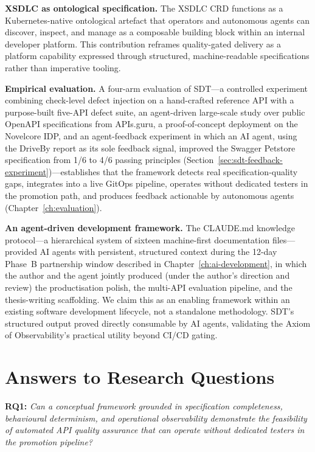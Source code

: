 \textbf{XSDLC as ontological specification.} The XSDLC CRD functions as a Kubernetes-native ontological artefact that operators and autonomous agents can discover, inspect, and manage as a composable building block within an internal developer platform. This contribution reframes quality-gated delivery as a platform capability expressed through structured, machine-readable specifications rather than imperative tooling.

\textbf{Empirical evaluation.} A four-arm evaluation of SDT---a controlled experiment combining check-level defect injection on a hand-crafted reference API with a purpose-built five-API defect suite, an agent-driven large-scale study over public OpenAPI specifications from APIs.guru, a proof-of-concept deployment on the Novelcore IDP, and an agent-feedback experiment in which an AI agent, using the DriveBy report as its sole feedback signal, improved the Swagger Petstore specification from 1/6 to 4/6 passing principles (Section~\ref{sec:sdt-feedback-experiment})---establishes that the framework detects real specification-quality gaps, integrates into a live GitOps pipeline, operates without dedicated testers in the promotion path, and produces feedback actionable by autonomous agents (Chapter~\ref{ch:evaluation}).

\textbf{An agent-driven development framework.} The CLAUDE.md knowledge protocol---a hierarchical system of sixteen machine-first documentation files---provided AI agents with persistent, structured context during the 12-day Phase~B partnership window described in Chapter~\ref{ch:ai-development}, in which the author and the agent jointly produced (under the author's direction and review) the productisation polish, the multi-API evaluation pipeline, and the thesis-writing scaffolding. We claim this as an enabling framework within an existing software development lifecycle, not a standalone methodology. SDT's structured output proved directly consumable by AI agents, validating the Axiom of Observability's practical utility beyond CI/CD gating.

\section{Answers to Research Questions}
\label{sec:rq-answers}

\textbf{RQ1:} \textit{Can a conceptual framework grounded in specification completeness, behavioural determinism, and operational observability demonstrate the feasibility of automated API quality assurance that can operate without dedicated testers in the promotion pipeline?}

